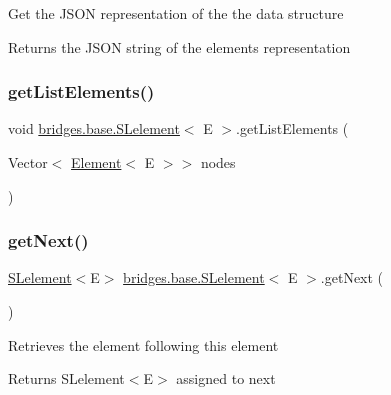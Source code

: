 Get the J\+S\+ON representation of the the data structure

\begin{DoxyReturn}{Returns}
the J\+S\+ON string of the element\textquotesingle{}s representation 
\end{DoxyReturn}
\mbox{\label{classbridges_1_1base_1_1_s_lelement_abadffea339171349a8e86ded9cd3fe21}} 
\subsubsection{\texorpdfstring{get\+List\+Elements()}{getListElements()}}
{\footnotesize\ttfamily void \hyperlink{classbridges_1_1base_1_1_s_lelement}{bridges.\+base.\+S\+Lelement}$<$ E $>$.get\+List\+Elements (\begin{DoxyParamCaption}\item[{Vector$<$ \hyperlink{classbridges_1_1base_1_1_element}{Element}$<$ E $>$$>$}]{nodes }\end{DoxyParamCaption})\hspace{0.3cm}{\ttfamily [protected]}}

\mbox{\label{classbridges_1_1base_1_1_s_lelement_a060c4671e05e3f20b16630343393b80d}} 
\subsubsection{\texorpdfstring{get\+Next()}{getNext()}}
{\footnotesize\ttfamily \hyperlink{classbridges_1_1base_1_1_s_lelement}{S\+Lelement}$<$E$>$ \hyperlink{classbridges_1_1base_1_1_s_lelement}{bridges.\+base.\+S\+Lelement}$<$ E $>$.get\+Next (\begin{DoxyParamCaption}{ }\end{DoxyParamCaption})}

Retrieves the element following this element

\begin{DoxyReturn}{Returns}
S\+Lelement$<$\+E$>$ assigned to next 
\end{DoxyReturn}
\mbox{\label{classbridges_1_1base_1_1_s_lelement_a2ecf938707a8009f28dcb98112ede9d9}} 
